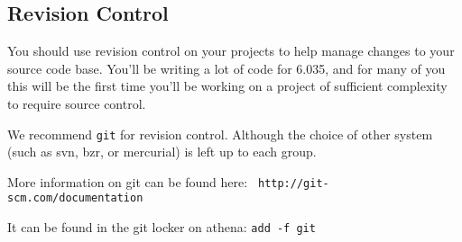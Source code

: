 
\subsection*{Revision Control}

You should use revision control on your projects to help manage changes to
your source code base. You'll be writing a lot of code for 6.035, and for
many of you this will be the first time you'll be working on a project of
sufficient complexity to require source control.

We recommend {\tt git} for revision control.  Although the choice of other
system (such as svn, bzr, or mercurial) is left up to each group.

More information on git can be found here: {\tt
http://git-scm.com/documentation}

It can be found in the git locker on athena: {\tt add -f git}





